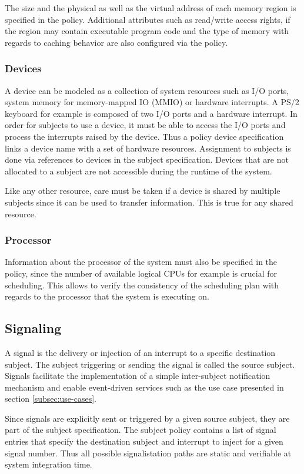 The size and the physical as well as the virtual address of each memory region
is specified in the policy. Additional attributes such as read/write access
rights, if the region may contain executable program code and the type of memory
with regards to caching behavior are also configured via the policy.

\subsubsection{Devices}
A device can be modeled as a collection of system resources such as I/O ports,
system memory for memory-mapped IO (MMIO) or hardware interrupts. A PS/2
keyboard for example is composed of two I/O ports and a hardware interrupt.
In order for subjects to use a device, it must be able to access the I/O ports
and process the interrupts raised by the device. Thus a policy device
specification links a device name with a set of hardware resources. Assignment
to subjects is done via references to devices in the subject specification.
Devices that are not allocated to a subject are not accessible during the
runtime of the system.

Like any other resource, care must be taken if a device is shared by multiple
subjects since it can be used to transfer information. This is true for any
shared resource.

\subsubsection{Processor}
Information about the processor of the system must also be specified in the
policy, since the number of available logical CPUs for example is crucial for
scheduling. This allows to verify the consistency of the scheduling plan with
regards to the processor that the system is executing on.

\subsection{Signaling}
A signal is the delivery or injection of an interrupt to a specific destination
subject. The subject triggering or sending the signal is called the source
subject. Signals facilitate the implementation of a simple inter-subject
notification mechanism and enable event-driven services such as the use case
presented in section \ref{subsec:use-cases}.

Since signals are explicitly sent or triggered by a given source subject, they
are part of the subject specification. The subject policy contains a list of
signal entries that specify the destination subject and interrupt to inject for
a given signal number. Thus all possible signalistation paths are static and
verifiable at system integration time.

